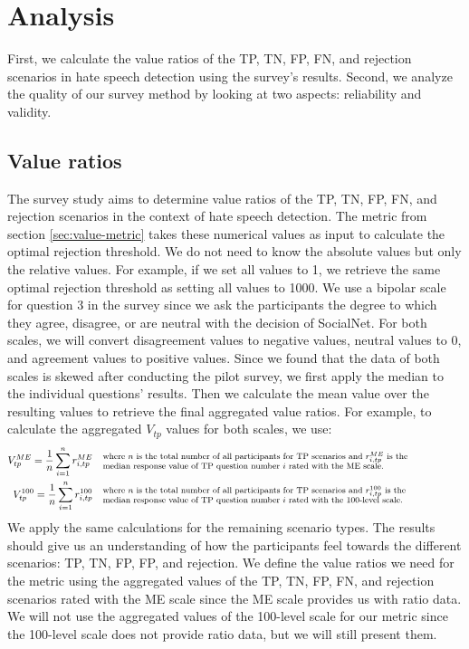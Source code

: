 \section{Analysis}
\label{sec:survey-analysis}
First, we calculate the value ratios of the TP, TN, FP, FN, and rejection scenarios in hate speech detection using the survey's results.
%
Second, we analyze the quality of our survey method by looking at two aspects: reliability and validity.

\subsection{Value ratios}
\label{sec:analysis-values}
The survey study aims to determine value ratios of the TP, TN, FP, FN, and rejection scenarios in the context of hate speech detection.
%
The metric from section \ref{sec:value-metric} takes these numerical values as input to calculate the optimal rejection threshold.
%
We do not need to know the absolute values but only the relative values.
%
For example, if we set all values to 1, we retrieve the same optimal rejection threshold as setting all values to 1000.
%
We use a bipolar scale for question 3 in the survey since we ask the participants the degree to which they agree, disagree, or are neutral with the decision of SocialNet.
%
For both scales, we will convert disagreement values to negative values, neutral values to 0, and agreement values to positive values.
%
Since we found that the data of both scales is skewed after conducting the pilot survey, we first apply the median to the individual questions' results.
%
Then we calculate the mean value over the resulting values to retrieve the final aggregated value ratios.
%
For example, to calculate the aggregated $V_{tp}$ values for both scales, we use:
\begin{align*}
    V_{tp}^{ME} = \frac{1}{n} \sum_{i=1}^{n} r_{i, tp}^{ME}   & \quad  \parbox{35em}{\footnotesize where $n$ is the total number of all participants for TP scenarios and $r_{i, tp}^{ME}$ is the  \\median response value of TP question number $i$ rated with the ME scale.}\\
    V_{tp}^{100} = \frac{1}{n} \sum_{i=1}^{n} r_{i, tp}^{100} & \quad  \parbox{35em}{\footnotesize where $n$ is the total number of all participants for TP scenarios and $r_{i, tp}^{100}$ is the \\median response value of TP question number $i$ rated with the 100-level scale.}
\end{align*}
%
We apply the same calculations for the remaining scenario types.
%
The results should give us an understanding of how the participants feel towards the different scenarios: TP, TN, FP, FP, and rejection.
%
We define the value ratios we need for the metric using the aggregated values of the TP, TN, FP, FN, and rejection scenarios rated with the ME scale since the ME scale provides us with ratio data.
%
We will not use the aggregated values of the 100-level scale for our metric since the 100-level scale does not provide ratio data, but we will still present them.

